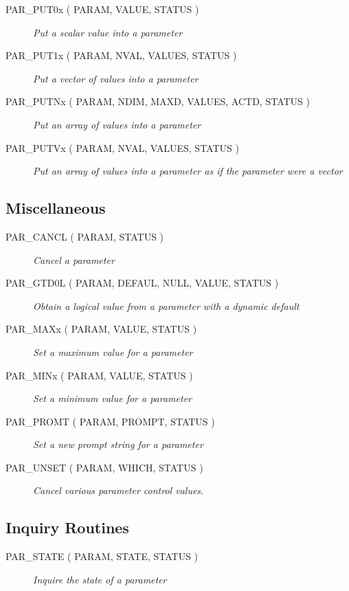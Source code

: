 \documentclass[twoside,11pt]{article}
\newcommand{\htmlref}[2]{#1}
\newcommand{\xlabel}[1]{}
\newcommand{\listline}{\hspace{1pt}\\}
\renewcommand{\listline}{}
\begin{document}
\begin{description}
\item [\htmlref{PAR\_PUT0x}{PAR_PUT0x} 
( PARAM, VALUE, STATUS )] \listline
\textit{Put a scalar value into a parameter}
\item [\htmlref{PAR\_PUT1x}{PAR_PUT1x} 
( PARAM, NVAL, VALUES, STATUS )] \listline
\textit{Put a vector of values into a parameter}
\item [\htmlref{PAR\_PUTNx}{PAR_PUTNx} 
( PARAM, NDIM, MAXD, VALUES, ACTD, STATUS )] \listline
\textit{Put an array of values into a parameter}
\item [\htmlref{PAR\_PUTVx}{PAR_PUTVx} 
( PARAM, NVAL, VALUES, STATUS )] \listline
\textit{Put an array of values into a parameter as if the parameter were a
            vector}
\end{description}

\subsection{\xlabel{miscellaneous}Miscellaneous}

\begin{description}
\item [\htmlref{PAR\_CANCL}{PAR_CANCL} 
( PARAM, STATUS )] \listline
\textit{Cancel a parameter}
\item [\htmlref{PAR\_GTD0L}{PAR_GTD0L} 
( PARAM, DEFAUL, NULL, VALUE, STATUS )] \listline
\textit{Obtain a logical value from a parameter with a dynamic default}
\item [\htmlref{PAR\_MAXx}{PAR_MAXx} 
( PARAM, VALUE, STATUS )] \listline
\textit{Set a maximum value for a parameter}
\item [\htmlref{PAR\_MINx}{PAR_MINx} 
( PARAM, VALUE, STATUS )] \listline
\textit{Set a minimum value for a parameter}
\item [\htmlref{PAR\_PROMT}{PAR_PROMT} 
( PARAM, PROMPT, STATUS )] \listline
\textit{Set a new prompt string for a parameter}
\item [\htmlref{PAR\_UNSET}{PAR_UNSET} 
( PARAM, WHICH, STATUS )] \listline
\textit{Cancel various parameter control values.}
\end{description}

\subsection{\xlabel{inquiry_routines}Inquiry Routines}

\begin{description}
\item [\htmlref{PAR\_STATE}{PAR_STATE} 
( PARAM, STATE, STATUS )] \listline
\textit{Inquire the state of a parameter}
\end{description}
\end{document}
